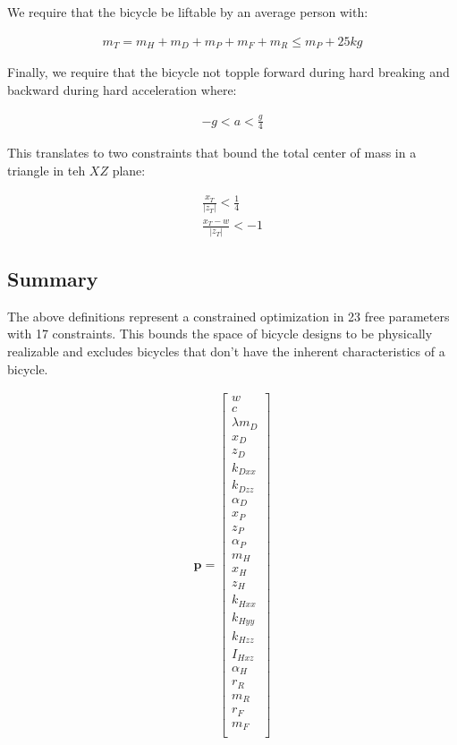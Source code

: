\documentclass{article}
\begin{document}
We require that the bicycle be liftable by an average person with:

\begin{align}
  m_T = m_H + m_D + m_P + m_F + m_R \leq m_P + 25 \si{kg}
\end{align}

Finally, we require that the bicycle not topple forward during hard breaking
and backward during hard acceleration where:

\begin{align}
  -g < a < \frac{g}{4}
\end{align}

This translates to two constraints that bound the total center of mass in a triangle in teh $XZ$ plane:

\begin{align} \frac{x_T}{|z_T|} < \frac{1}{4} \\ \frac{x_T - w}{|z_T|} < -1
\end{align}

\subsection{Summary}

The above definitions represent a constrained optimization in 23 free
parameters with 17 constraints. This bounds the space of bicycle designs to be
physically realizable and excludes bicycles that don't have the inherent
characteristics of a bicycle.

\begin{align}
  \mathbf{p} =
  \begin{bmatrix}
    w \\
    c \\
    \lambda
    m_D \\
    x_D \\
    z_D \\
    k_{Dxx} \\
    k_{Dzz} \\
    \alpha_D \\
    x_P \\
    z_P \\
    \alpha_P \\
    m_H \\
    x_H \\
    z_H \\
    k_{Hxx} \\
    k_{Hyy} \\
    k_{Hzz} \\
    I_{Hxz} \\
    \alpha_H \\
    r_R \\
    m_R \\
    r_F \\
    m_F \\
  \end{bmatrix}
\end{align}
\end{document}
